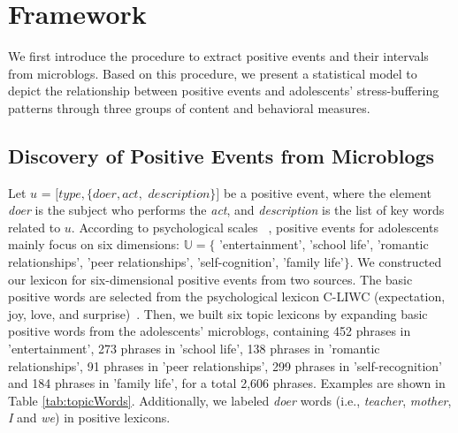 \section{Framework}
\label{sec:frame}
We first introduce the procedure to extract positive events and their intervals from microblogs. 
Based on this procedure, 
we present a statistical model to depict the relationship between positive events and adolescents' stress-buffering patterns through three groups of content and behavioral measures. 

\subsection{Discovery of Positive Events from Microblogs}
\label{sec:frame1}
Let $u$ = $[type,\{doer, act,$ $description\}]$ be a positive event, 
where the element \emph{doer} is the subject who performs the \emph{act}, 
and \emph{description} is the list of key words related to $u$. 
According to psychological scales ~\citep{Jun2008Influence,hassles}, 
positive events for adolescents mainly focus on six dimensions: 
$\mathbb{U} =\{$ 'entertainment', 'school life', 'romantic relationships', 
'peer relationships', 'self-cognition', 'family life'$\}$. 
We constructed our lexicon for six-dimensional positive events from two sources. 
The basic positive words are selected from the psychological lexicon C-LIWC 
(expectation, joy, love, and surprise)~\citep{Tausczik2010The}. 
Then, we built six topic lexicons by expanding basic positive words from the adolescents' microblogs, 
containing 452 phrases in 'entertainment', 
273 phrases in 'school life', 
138 phrases in 'romantic relationships', 
91 phrases in 'peer relationships', 
299 phrases in 'self-recognition' and 184 phrases in 'family life', for a total 2,606 phrases. 
Examples are shown in Table \ref{tab:topicWords}. 
Additionally, we labeled \emph{doer} words (i.e., \emph{teacher}, \emph{mother}, 
\emph{I} and \emph{we}) in positive lexicons. 

